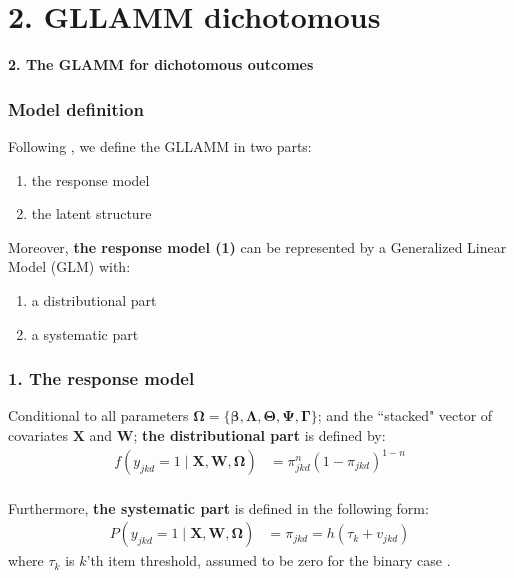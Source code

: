 \documentclass[arial,12pt,xcolor=dvipsnames]{beamer}
\begin{document}
\section{2. GLLAMM dichotomous}
%
\begin{frame}
	\textbf{2. The GLAMM for dichotomous outcomes}
\end{frame}
%
\begin{frame}
	\frametitle{Model definition}
	Following \citet{Rabe_et_al_2004a, Rabe_et_al_2004b}, we define the GLLAMM in two parts: 
	\begin{enumerate}
		\item the response model
		\item the latent structure
	\end{enumerate}
	\vspace{0.3cm} Moreover, \textbf{the response model (1)} can be represented by 
	a Generalized Linear Model (GLM) \cite{Nelder_et_al_1972, Nelder_et_al_1989} with:
	\begin{enumerate}
		\item a distributional part
		\item a systematic part
	\end{enumerate}
\end{frame}
%
\begin{frame}
	\frametitle{1. The response model}
	Conditional to all parameters $\pmb{\Omega} = \{ \pmb{\beta}, \pmb{\Lambda}, \pmb{\Theta}, \pmb{\Psi}, \pmb{\Gamma} \}$; and the ``stacked" vector of covariates $\mathbf{X}$ and $\mathbf{W}$; \textbf{the distributional part} is defined by:
	\begin{equation} \label{eq:distributional}
		\begin{split}
			f \left( y_{jkd}=1 \; | \; \mathbf{X}, \mathbf{W}, \pmb{\Omega} \right) &= \pi_{jkd}^{n} (1 - \pi_{jkd})^{1-n}
		\end{split}
	\end{equation} \\
	\vspace{0.3cm} Furthermore, \textbf{the systematic part} is defined in the following form:
	\begin{equation} \label{eq:systematic}
		\begin{split}
			P\left( y_{jkd}=1 \; | \; \mathbf{X}, \mathbf{W}, \pmb{\Omega} \right) &= \pi_{jkd} = h( \tau_{k} + v_{jkd} )
		\end{split}	
	\end{equation}
	where $\tau_{k}$ is $k$'th item threshold, assumed to be zero for the binary case \cite{Rabe_et_al_2004a}.
\end{frame}
\end{document}
